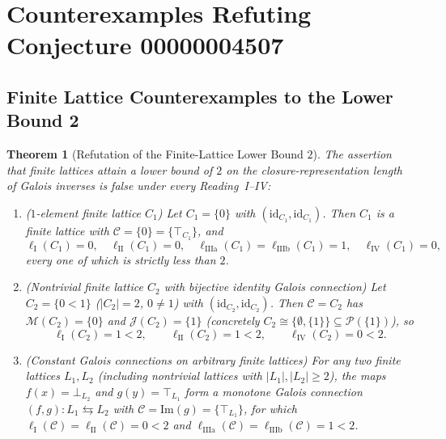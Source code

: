 \documentclass[11pt,a4paper]{article}
\newtheorem{theorem}{Theorem}[section]
\theoremstyle{definition}
\theoremstyle{remark}
\begin{document}
\section{Counterexamples Refuting Conjecture 00000004507}

\subsection{Finite Lattice Counterexamples to the Lower Bound 2}

\begin{theorem}[Refutation of the Finite-Lattice Lower Bound $2$]\label{thm:finite-refutation}
The assertion that finite lattices attain a lower bound of $2$ on the closure-representation length of Galois inverses is false under every Reading~I--IV:
\begin{enumerate}
\item \emph{($1$-element finite lattice $C_1$)} Let $C_1 = \{0\}$ with $(\mathrm{id}_{C_1}, \mathrm{id}_{C_1})$. Then $C_1$ is a finite lattice with $\mathcal{C} = \{0\} = \{\top_{C_1}\}$, and
\[
\ell_{\mathrm{I}}(C_1) = 0, \quad \ell_{\mathrm{II}}(C_1) = 0, \quad
\ell_{\mathrm{IIIa}}(C_1) = \ell_{\mathrm{IIIb}}(C_1) = 1, \quad \ell_{\mathrm{IV}}(C_1) = 0,
\]
every one of which is strictly less than $2$.

\item \emph{(Nontrivial finite lattice $C_2$ with bijective identity Galois connection)} Let $C_2 = \{0 < 1\}$ ($|C_2| = 2$, $0 \neq 1$) with $(\mathrm{id}_{C_2}, \mathrm{id}_{C_2})$. Then $\mathcal{C} = C_2$ has $\mathcal{M}(C_2) = \{0\}$ and $\mathcal{J}(C_2) = \{1\}$ (concretely $C_2 \cong \{\emptyset, \{1\}\} \subseteq \mathcal{P}(\{1\})$), so
\[
\ell_{\mathrm{I}}(C_2) = 1 < 2, \qquad \ell_{\mathrm{II}}(C_2) = 1 < 2, \qquad \ell_{\mathrm{IV}}(C_2) = 0 < 2.
\]

\item \emph{(Constant Galois connections on arbitrary finite lattices)} For \emph{any} two finite lattices $L_1, L_2$ (including nontrivial lattices with $|L_1|, |L_2| \ge 2$), the maps $f(x) = \bot_{L_2}$ and $g(y) = \top_{L_1}$ form a monotone Galois connection $(f, g) : L_1 \leftrightarrows L_2$ with $\mathcal{C} = \mathrm{Im}(g) = \{\top_{L_1}\}$, for which $\ell_{\mathrm{I}}(\mathcal{C}) = \ell_{\mathrm{II}}(\mathcal{C}) = 0 < 2$ and $\ell_{\mathrm{IIIa}}(\mathcal{C}) = \ell_{\mathrm{IIIb}}(\mathcal{C}) = 1 < 2$.


\end{enumerate}
\end{theorem}
\end{document}
